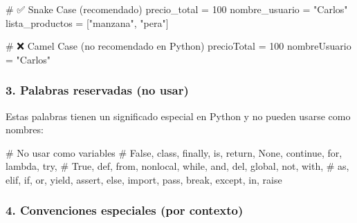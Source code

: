 \documentclass[
  doc,
  floatsintext,
  longtable,
  a4paper,
  nolmodern,
  notxfonts,
  notimes,
  12pt,
  colorlinks=true,linkcolor=blue,citecolor=blue,urlcolor=blue]{apa7}
\newenvironment{Shaded}{\begin{snugshade}}{\end{snugshade}}
\newcommand{\CommentTok}[1]{\textcolor[rgb]{0.37,0.37,0.37}{#1}}
\newcommand{\DecValTok}[1]{\textcolor[rgb]{0.68,0.00,0.00}{#1}}
\newcommand{\NormalTok}[1]{\textcolor[rgb]{0.00,0.23,0.31}{#1}}
\newcommand{\OperatorTok}[1]{\textcolor[rgb]{0.37,0.37,0.37}{#1}}
\newcommand{\StringTok}[1]{\textcolor[rgb]{0.13,0.47,0.30}{#1}}
\begin{document}
\begin{Shaded}
\begin{Highlighting}[]
\CommentTok{\# ✅ Snake Case (recomendado)}
\NormalTok{precio\_total }\OperatorTok{=} \DecValTok{100}
\NormalTok{nombre\_usuario }\OperatorTok{=} \StringTok{"Carlos"}
\NormalTok{lista\_productos }\OperatorTok{=}\NormalTok{ [}\StringTok{"manzana"}\NormalTok{, }\StringTok{"pera"}\NormalTok{]}

\CommentTok{\# ❌ Camel Case (no recomendado en Python)}
\NormalTok{precioTotal }\OperatorTok{=} \DecValTok{100}
\NormalTok{nombreUsuario }\OperatorTok{=} \StringTok{"Carlos"}
\end{Highlighting}
\end{Shaded}

\subsubsection{3. Palabras reservadas (no
usar)}\label{palabras-reservadas-no-usar}

Estas palabras tienen un significado especial en Python y no pueden
usarse como nombres:

\begin{Shaded}
\begin{Highlighting}[]
\CommentTok{\# No usar como variables}
\CommentTok{\# False, class, finally, is, return, None, continue, for, lambda, try,}
\CommentTok{\# True, def, from, nonlocal, while, and, del, global, not, with,}
\CommentTok{\# as, elif, if, or, yield, assert, else, import, pass, break, except, in, raise}
\end{Highlighting}
\end{Shaded}

\subsubsection{4. Convenciones especiales (por
contexto)}\label{convenciones-especiales-por-contexto}
\end{document}
